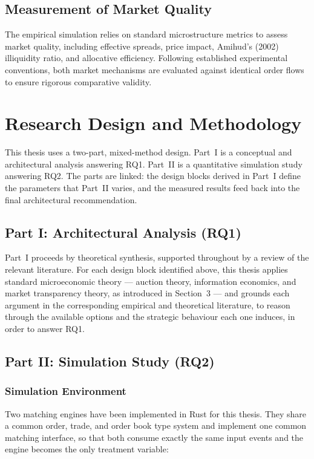 \documentclass[11pt]{article}
\begin{document}
\subsection{Measurement of Market Quality}
The empirical simulation relies on standard microstructure metrics to assess market quality, including effective spreads, price impact, Amihud's (2002) illiquidity ratio, and allocative efficiency. Following established experimental conventions, both market mechanisms are evaluated against identical order flows to ensure rigorous comparative validity.




\section{Research Design and Methodology}

This thesis uses a two-part, mixed-method design. Part~I is a conceptual and architectural analysis answering RQ1. Part~II is a quantitative simulation study answering RQ2. The parts are linked: the design blocks derived in Part~I define the parameters that Part~II varies, and the measured results feed back into the final architectural recommendation.

\subsection{Part I: Architectural Analysis (RQ1)}

Part~I proceeds by theoretical synthesis, supported throughout by a review of the relevant literature. For each design block identified above, this thesis applies standard microeconomic theory --- auction theory, information economics, and market transparency theory, as introduced in Section~3 --- and grounds each argument in the corresponding empirical and theoretical literature, to reason through the available options and the strategic behaviour each one induces, in order to answer RQ1.

\subsection{Part II: Simulation Study (RQ2)}

\subsubsection{Simulation Environment}
Two matching engines have been implemented in Rust for this thesis. They share a common order, trade, and order book type system and implement one common matching interface, so that both consume exactly the same input events and the engine becomes the only treatment variable:
\end{document}
